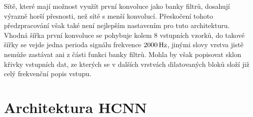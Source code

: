 Sítě, které mají možnost využít první konvoluce jako banky filtrů, dosahují výrazně horší přesnosti, než sítě s menší konvolucí. Přeskočení tohoto předzpracování však také není nejlepším nastavením pro tuto architekturu. Vhodná šířka první konvoluce se pohybuje kolem 8 vstupních vzorků, do takové šířky se vejde jedna perioda signálu frekvence $2000\,\rm Hz$, jinými slovy vrstva jistě nemůže zastávat ani z části funkci banky filtrů. Mohla by však popisovat sklon křivky vstupních dat, ze kterých se v dalších vrstvách dilatovaných bloků složí již celý frekvenční popis vstupu.





\section{Architektura HCNN}

